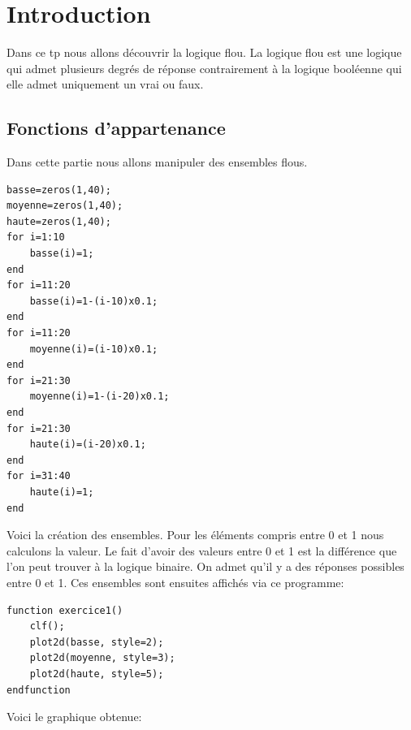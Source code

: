 \documentclass[a4paper,12pt]{report}
\begin{document}


\setcounter{page}{1} 
\newpage

\section*{Introduction}

Dans ce tp nous allons découvrir la logique flou. La logique flou est une logique qui admet plusieurs degrés de réponse contrairement à la logique booléenne qui elle admet uniquement un vrai ou faux.


\subsection*{Fonctions d'appartenance}

Dans cette partie nous allons manipuler des ensembles flous. 

\begin{lstlisting}[style=Scilab,caption={Code question 1},label=lst:e1q1]
basse=zeros(1,40);
moyenne=zeros(1,40);
haute=zeros(1,40);
for i=1:10
    basse(i)=1;
end
for i=11:20
    basse(i)=1-(i-10)x0.1;
end
for i=11:20
    moyenne(i)=(i-10)x0.1;
end
for i=21:30
    moyenne(i)=1-(i-20)x0.1;
end    
for i=21:30
    haute(i)=(i-20)x0.1;
end
for i=31:40
    haute(i)=1;
end
\end{lstlisting}

Voici la création des ensembles. Pour les éléments compris entre 0 et 1 nous calculons la valeur. Le fait d'avoir des valeurs entre 0 et 1 est la différence que l'on peut trouver à la logique binaire. On admet qu'il y a des réponses possibles entre 0 et 1.
Ces ensembles sont ensuites affichés via ce programme:

\begin{lstlisting}[style=Scilab,caption={Code question 1},label=lst:e1q2]
function exercice1()
    clf();
    plot2d(basse, style=2);
    plot2d(moyenne, style=3);
    plot2d(haute, style=5);
endfunction
\end{lstlisting}

\newpage

Voici le graphique obtenue:
\end{document}
